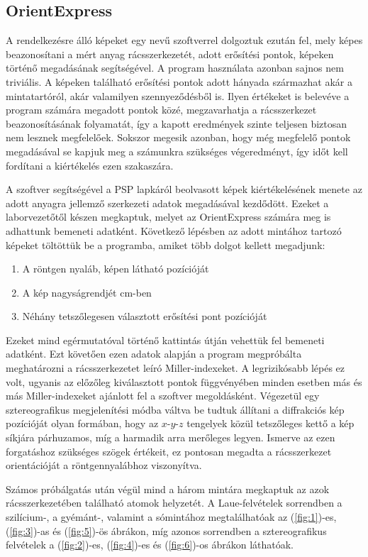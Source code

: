 \begin{multicols}{2}
\subsection{OrientExpress}
A rendelkezésre álló képeket egy  nevű szoftverrel dolgoztuk ezután fel, mely képes beazonosítani a mért anyag rácsszerkezetét, adott erősítési pontok, képeken történő megadásának segítségével. A program használata azonban sajnos nem triviális. A képeken található erősítési pontok adott hányada származhat akár a mintatartóról, akár valamilyen szennyeződésből is. Ilyen  értékeket is belevéve a program számára megadott pontok közé, megzavarhatja a rácsszerkezet beazonosításának folyamatát, így a kapott eredmények szinte teljesen biztosan nem lesznek megfelelőek. Sokszor megesik azonban, hogy még megfelelő pontok megadásával se kapjuk meg a számunkra szükséges végeredményt, így időt kell fordítani a kiértékelés ezen szakaszára. \par
A szoftver segítségével a PSP lapkáról beolvasott képek kiértékelésének menete az adott anyagra jellemző szerkezeti adatok megadásával kezdődött. Ezeket a laborvezetőtől készen megkaptuk, melyet az OrientExpress számára meg is adhattunk bemeneti adatként. Következő lépésben az adott mintához tartozó képeket töltöttük be a programba, amiket több dolgot kellett megadjunk:
\begin{enumerate}
	\item A röntgen nyaláb, képen látható pozícióját
	\item A kép nagyságrendjét cm-ben
	\item Néhány tetszőlegesen választott erősítési pont pozícióját
\end{enumerate}
Ezeket mind egérmutatóval történő kattintás útján vehettük fel bemeneti adatként. Ezt követően ezen adatok alapján a program megpróbálta meghatározni a rácsszerkezetet leíró Miller-indexeket. A legrizikósabb lépés ez volt, ugyanis az előzőleg kiválasztott pontok függvényében minden esetben más és más Miller-indexeket ajánlott fel a szoftver megoldásként. Végezetül egy sztereografikus megjelenítési módba váltva be tudtuk állítani a diffrakciós kép pozícióját olyan formában, hogy az $x$-$y$-$z$ tengelyek közül tetszőleges kettő a kép síkjára párhuzamos, míg a harmadik arra merőleges legyen. Ismerve az ezen forgatáshoz szükséges szögek értékeit, ez pontosan megadta a rácsszerkezet orientációját a röntgennyalábhoz viszonyítva. \par
Számos próbálgatás után végül mind a három mintára megkaptuk az azok rácsszerkezetében található atomok helyzetét. A Laue-felvételek sorrendben a szilícium-, a gyémánt-, valamint a sómintához megtalálhatóak az (\ref{fig:1})-es, (\ref{fig:3})-as és (\ref{fig:5})-ös ábrákon, míg azonos sorrendben a sztereografikus felvételek a (\ref{fig:2})-es, (\ref{fig:4})-es és (\ref{fig:6})-os ábrákon láthatóak.


\end{multicols}
